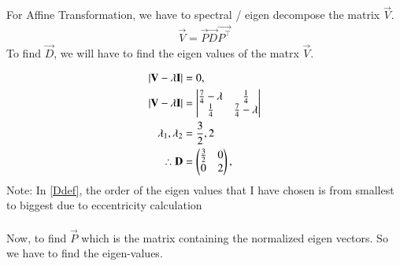 \documentclass[journal]{IEEEtran}
\begin{document}
For Affine Transformation, we have to spectral / eigen decompose the matrix $\vec{V}$. \\ 

\begin{align}
	\vec{V} = \vec{P}\vec{D}\vec{P^\top}
\end{align}
To find $\vec{D}$, we will have to find the eigen values of the matrx $\vec{V}$.

	\begin{align}
		|\mathbf{V}  - \lambda\mathbf{I}|  &= 0,\\
		|\mathbf{V}  - \lambda\mathbf{I}|  &= \begin{vmatrix}\frac{7}{4} - \lambda& \frac{1}{4}\\ \frac{1}{4} & \frac{7}{4} - \lambda\end{vmatrix}\\
		\lambda_1, \lambda_2 &= \frac{3}{2} , 2\\
		\therefore 	\mathbf{D} &= \begin{pmatrix}\frac{3}{2} & 0 \\ 0 & 2	\end{pmatrix} , \label{Ddef}
	\end{align}
Note: In \eqref{Ddef}, the order of the eigen values that I have chosen is from smallest to biggest due to eccentricity calculation\\
\\
Now, to find $\vec{P}$ which is the matrix containing the normalized eigen vectors. So we have to find the eigen-values.
\end{document}
